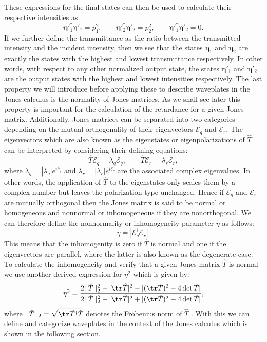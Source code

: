 These expressions for the final states can then be used to calculate their respective intensities as:
\begin{equation}
    \bm{\eta}'^{\dagger}_1\bm{\eta}'_1=p_1^2, \qquad 
    \bm{\eta}'^{\dagger}_2\bm{\eta}'_2=p_2^2, \qquad 
    \bm{\eta}'^{\dagger}_1\bm{\eta}'_2=0.
\end{equation}
If we further define the transmittance as the ratio between the transmitted intensity and the incident intensity, then we see that the states $\bm{\eta}_1$ and $\bm{\eta}_2$ are exactly the states with the highest and lowest transmittance respectively. In other words, with respect to any other normalized output state, the states $\bm{\eta}'_1$ and $\bm{\eta}'_2$ are the output states with the highest and lowest intensities respectively. The last property we will introduce before applying these to describe waveplates in the Jones calculus is the normality of Jones matrices. As we shall see later this property is important for the calculation of the retardance for a given Jones matrix. Additionally, Jones matrices can be separated into two categories depending on the mutual orthogonality of their eigenvectors $\bm{\mathcal{E}}_q$ and $\bm{\mathcal{E}}_r$. The eigenvectors which are also known as the eigenstates or eigenpolarizations of $\hat{T}$ can be interpreted by considering their defining equations:
\begin{equation}
    \hat{T}\bm{\mathcal{E}}_q = \lambda_q\bm{\mathcal{E}}_q, \qquad 
    \hat{T}\bm{\mathcal{E}}_r = \lambda_r\bm{\mathcal{E}}_r,
\end{equation}
where $\lambda_q = |\lambda_q|e^{i\delta_q}$ and $\lambda_r = |\lambda_r|e^{i\delta_r}$ are the associated complex eigenvalues. In other words, the application of $\hat{T}$ to the eigenstates only scales them by a complex number but leaves the polarization type unchanged. Hence if $\bm{\mathcal{E}}_q$ and $\bm{\mathcal{E}}_r$ are mutually orthogonal then the Jones matrix is said to be normal or homogeneous and nonnormal or inhomogeneous if they are nonorthogonal. We can therefore define the nonnormality or inhomogeneity parameter $\eta$ as follows:
\begin{equation}
    \eta=|\bm{\mathcal{E}}^{\dagger}_q \bm{\mathcal{E}}_r|.
\end{equation}
This means that the inhomogenity is zero if $\hat{T}$ is normal and one if the eigenvectors are parallel, where the latter is also known as the degenerate case. To calculate the inhomogeneity and verify that a given Jones matrix $\hat{T}$ is normal we use another derived expression for $\eta^2$ which is given by:
\begin{equation}
    \eta^2 = \frac{2||\hat{T}||_2^2-|\tr\hat{T}|^2-|(\tr\hat{T})^2-4\det\hat{T}|}{2||\hat{T}||_2^2-|\tr\hat{T}|^2+|(\tr\hat{T})^2-4\det\hat{T}|},
\end{equation}
where $||\hat{T}||_2=\sqrt{\tr \hat{T}^{\dagger} \hat{T}}$ denotes the Frobenius norm of $\hat{T}$ \cite{Lu1994}. With this we can define and categorize waveplates in the context of the Jones calculus which is shown in the following section. 

